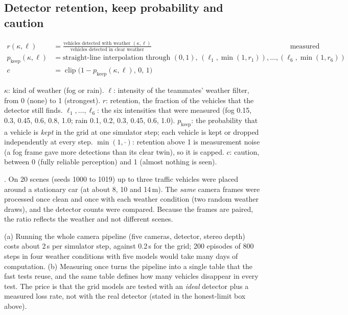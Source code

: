 \subsection{Detector retention, keep probability and caution}\label{sec:retentionformula}
\begin{align*}
r(\kappa,\ell) &= \frac{\text{vehicles detected with weather }(\kappa,\ell)}{\text{vehicles detected in clear weather}}&&\text{measured once, offline}\\
p_{\text{keep}}(\kappa,\ell) &= \text{straight-line interpolation through }(0,1),\,(\ell_1,\min(1,r_1)),\dots,(\ell_6,\min(1,r_6))\\
c &= \operatorname{clip}\big(1-p_{\text{keep}}(\kappa,\ell),\,0,\,1\big)
\end{align*}
\begin{description}[leftmargin=2.6cm,style=nextline]
\item[Symbols] $\kappa$: kind of weather (fog or rain). $\ell$: intensity of the teammates' weather filter, from 0 (none) to 1 (strongest). $r$: retention, the fraction of the vehicles that the detector still finds. $\ell_1,\dots,\ell_6$: the six intensities that were measured (fog 0.15, 0.3, 0.45, 0.6, 0.8, 1.0; rain 0.1, 0.2, 0.3, 0.45, 0.6, 1.0). $p_{\text{keep}}$: the probability that a vehicle is \emph{kept} in the grid at one simulator step; each vehicle is kept or dropped independently at every step. $\min(1,\cdot)$: retention above 1 is measurement noise (a fog frame gave more detections than its clear twin), so it is capped. $c$: caution, between 0 (fully reliable perception) and 1 (almost nothing is seen).
\item[How retention was measured] . On 20 scenes (seeds 1000 to 1019) up to three traffic vehicles were placed around a stationary car (at about 8, 10 and 14\,m). The \emph{same} camera frames were processed once clean and once with each weather condition (two random weather draws), and the detector counts were compared. Because the frames are paired, the ratio reflects the weather and not different scenes.
\item[Why measure it offline, once] (a) Running the whole camera pipeline (five cameras, detector, stereo depth) costs about 2\,s per simulator step, against 0.2\,s for the grid; 200 episodes of 800 steps in four weather conditions with five models would take many days of computation. (b) Measuring once turns the pipeline into a single table that the fast tests reuse, and the same table defines how many vehicles disappear in every test. The price is that the grid models are tested with an \emph{ideal} detector plus a measured loss rate, not with the real detector (stated in the honest-limit box above).

\end{description}
